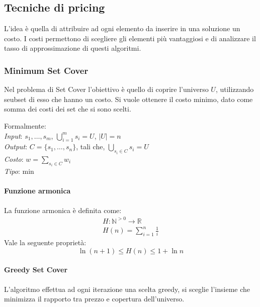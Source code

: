 \subsection{Tecniche di pricing}
L'idea è quella di attribuire ad ogni elemento da inserire in 
una soluzione un costo. I costi permettono di scegliere gli elementi 
più vantaggiosi e di analizzare il tasso di approssimazione di questi algoritmi.

\subsubsection{Minimum Set Cover}
\label{msetcover}
Nel problema di Set Cover l'obiettivo è quello di coprire l'universo $U$, 
utilizzando seubset di esso che hanno un costo. Si vuole ottenere il costo
minimo, dato come somma dei costi dei set che si sono scelti.

Formalmente: \\
\emph{Input}: $s_1, \dots, s_m$, $\bigcup_{i=1}^m s_i = U$, $|U| = n$\\
\emph{Output}: $C = \{s_1, \dots, s_n\}$, tali che, $\bigcup_{s_i \in C} s_i = U$\\
\emph{Costo}: $w = \sum_{s_i \in C} w_i$\\
\emph{Tipo}: min\\

\paragraph{Funzione armonica}
La funzione armonica è definita come: 
\begin{equation}
    \begin{aligned}
        H: \mathbb{N}^{>0} \rightarrow \mathbb{R}\\
        H(n) = \sum_{i = 1}^{n} \frac{1}{i}  
    \end{aligned}
\end{equation}
Vale la seguente proprietà: 
$$\ln (n+1) \leq H(n) \leq 1 +\ln n$$

\paragraph{Greedy Set Cover}
L'algoritmo effettua ad ogni iterazione una scelta greedy, 
si sceglie l'insieme che minimizza il rapporto tra prezzo e copertura 
dell'universo.

